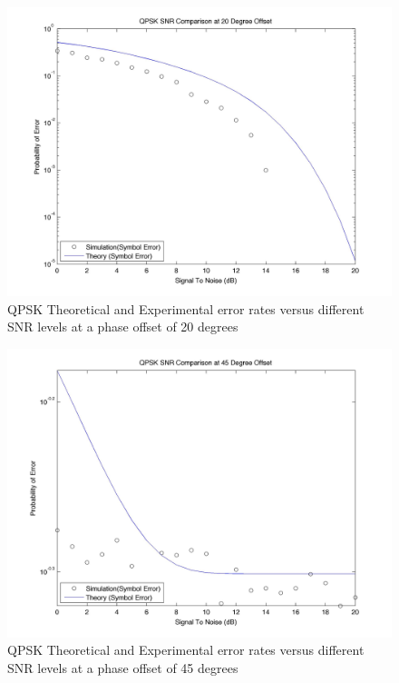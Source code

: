 \documentclass[]{article}
\begin{document}
\begin{figure}[H]
\centering
\hspace*{-2cm}\includegraphics[width=1.3\textwidth]{qpSNRpo3.jpg}
\caption{QPSK Theoretical and Experimental error rates versus different SNR levels at a phase offset of 20 degrees }
\end{figure}

\begin{figure}[H]
\centering
\hspace*{-2cm}\includegraphics[width=1.3\textwidth]{qpSNRpo4.jpg}
\caption{QPSK Theoretical and Experimental error rates versus different SNR levels at a phase offset of 45 degrees }
\end{figure}
\end{document}
